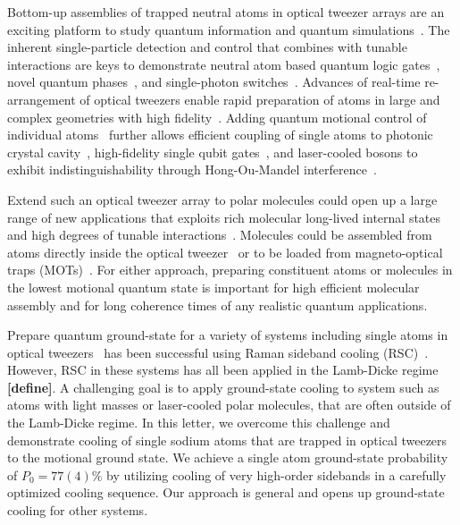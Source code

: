 \documentclass[aps,prl,twocolumn,groupedaddress]{revtex4-1}
\newcommand{\fxnote}[1]{{\textbf{[#1]}}}
\begin{document}
Bottom-up assemblies of trapped neutral atoms in optical tweezer arrays
are an exciting platform to study quantum information and quantum simulations~\cite{Schlosser2001,Weiss2004,Isenhower2010,Wilk2010,Kaufman2015,Labuhn2016,Murmann2015}.
The inherent single-particle detection and control that combines with tunable interactions
are keys to demonstrate neutral atom based quantum logic gates~\cite{Isenhower2010,Wilk2010},
novel quantum phases~\cite{Labuhn2016}, and single-photon switches~\cite{Dayan2008,Tiecke2014}.
Advances of real-time re-arrangement of optical tweezers enable rapid preparation of atoms
in large and complex geometries with high fidelity~\cite{Barredo2016,Endres2016}.
Adding quantum motional control of individual
atoms~\cite{Li2012,Kaufman2012,Thompson2013,Liu2017,Robens2017} further allows
efficient coupling of single atoms to photonic crystal cavity~\cite{Thompson2013a},
high-fidelity single qubit gates~\cite{Wang2016},
and laser-cooled bosons to exhibit indistinguishability
through Hong-Ou-Mandel interference~\cite{Kaufman2014}.

Extend such an optical tweezer array to polar molecules could open up a large range of
new applications that exploits rich molecular long-lived internal states
and high degrees of tunable interactions~\cite{DeMille2002,Ni2008,Gorshkov2011,Yan2013}.
Molecules could be assembled from atoms directly inside the optical tweezer~\cite{Liu2017}
or to be loaded from magneto-optical traps
(MOTs)~\cite{Barry2014,Truppe2017SubDoppler,Anderegg2017}.
For either approach, preparing constituent atoms or molecules in the lowest motional
quantum state is important for high efficient molecular assembly
and for long coherence times of any realistic quantum applications.

Prepare quantum ground-state for a variety of systems including
single atoms in optical tweezers~\cite{Kaufman2012,Thompson2013,Liu2017,Robens2017}
has been successful using Raman sideband cooling (RSC)~\cite{Monroe1995,Kerman2000,Han2000}.
However, RSC in these systems has all been applied in the Lamb-Dicke regime \fxnote{define}.
A challenging goal is to apply ground-state cooling to system such as atoms with light masses
or laser-cooled polar molecules, that are often outside of the Lamb-Dicke regime.
In this letter, we overcome this challenge and demonstrate cooling of single sodium atoms
that are trapped in optical tweezers to the motional ground state.
We achieve a single atom ground-state probability of $P_0=77(4)\%$ by utilizing cooling of
very high-order sidebands in a carefully optimized cooling sequence.
Our approach is  general and opens up ground-state cooling for other systems.
\end{document}
